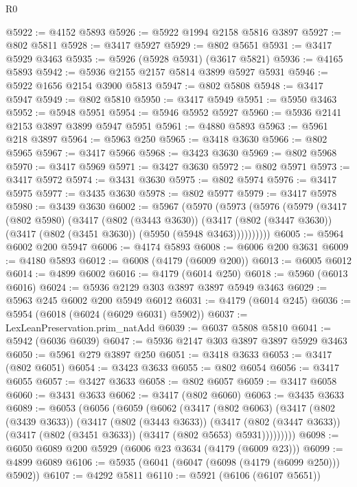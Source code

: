 \begin{lexlean}{R0}
\begin{coremodule}
@5922 := @4152 @5893
@5926 := @5922 @1994 @2158 @5816 @3897
@5927 := @802 @5811
@5928 := @3417 @5927
@5929 := @802 @5651
@5931 := @3417 @5929 @3463
@5935 := @5926 (@5928 @5931) (@3617 @5821)
@5936 := @4165 @5893
@5942 := @5936 @2155 @2157 @5814 @3899 @5927 @5931
@5946 := @5922 @1656 @2154 @3900 @5813
@5947 := @802 @5808
@5948 := @3417 @5947
@5949 := @802 @5810
@5950 := @3417 @5949
@5951 := @5950 @3463
@5952 := @5948 @5951
@5954 := @5946 @5952 @5927
@5960 := @5936 @2141 @2153 @3897 @3899 @5947 @5951
@5961 := @4880 @5893
@5963 := @5961 @218 @3897
@5964 := @5963 @250
@5965 := @3418 @3630
@5966 := @802 @5965
@5967 := @3417 @5966
@5968 := @3423 @3630
@5969 := @802 @5968
@5970 := @3417 @5969
@5971 := @3427 @3630
@5972 := @802 @5971
@5973 := @3417 @5972
@5974 := @3431 @3630
@5975 := @802 @5974
@5976 := @3417 @5975
@5977 := @3435 @3630
@5978 := @802 @5977
@5979 := @3417 @5978
@5980 := @3439 @3630
@6002 := @5967
    (@5970
      (@5973
        (@5976
          (@5979
            (@3417
              (@802 @5980)
              (@3417
                (@802 (@3443 @3630))
                (@3417
                  (@802 (@3447 @3630))
                  (@3417 (@802 (@3451 @3630)) (@5950 (@5948 @3463))))))))))
@6005 := @5964 @6002 @200 @5947
@6006 := @4174 @5893
@6008 := @6006 @200 @3631
@6009 := @4180 @5893
@6012 := @6008 (@4179 (@6009 @200))
@6013 := @6005 @6012
@6014 := @4899 @6002
@6016 := @4179 (@6014 @250)
@6018 := @5960 (@6013 @6016)
@6024 := @5936 @2129 @303 @3897 @3897 @5949 @3463
@6029 := @5963 @245 @6002 @200 @5949 @6012
@6031 := @4179 (@6014 @245)
@6036 := @5954 (@6018 (@6024 (@6029 @6031) @5902))
@6037 := LexLeanPreservation.prim_natAdd
@6039 := @6037 @5808 @5810
@6041 := @5942 (@6036 @6039)
@6047 := @5936 @2147 @303 @3897 @3897 @5929 @3463
@6050 := @5961 @279 @3897 @250
@6051 := @3418 @3633
@6053 := @3417 (@802 @6051)
@6054 := @3423 @3633
@6055 := @802 @6054
@6056 := @3417 @6055
@6057 := @3427 @3633
@6058 := @802 @6057
@6059 := @3417 @6058
@6060 := @3431 @3633
@6062 := @3417 (@802 @6060)
@6063 := @3435 @3633
@6089 := @6053
    (@6056
      (@6059
        (@6062
          (@3417
            (@802 @6063)
            (@3417
              (@802 (@3439 @3633))
              (@3417
                (@802 (@3443 @3633))
                (@3417
                  (@802 (@3447 @3633))
                  (@3417 (@802 (@3451 @3633)) (@3417 (@802 @5653) @5931)))))))))
@6098 := @6050 @6089 @200 @5929 (@6006 @23 @3634 (@4179 (@6009 @23)))
@6099 := @4899 @6089
@6106 := @5935 (@6041 (@6047 (@6098 (@4179 (@6099 @250))) @5902))
@6107 := @4292 @5811
@6110 := @5921 (@6106 (@6107 @5651))

\end{coremodule}
\end{lexlean}
